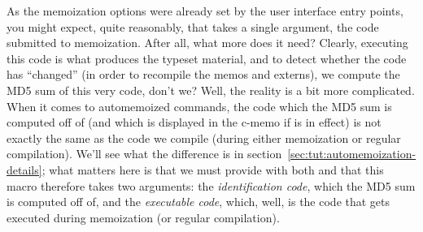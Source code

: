 \documentclass[a4paper,11pt]{article}
\begin{document}
\begin{center}
\end{center}

As the memoization options were already set by the user interface entry points,
you might expect, quite reasonably, that  takes a single
argument, the code submitted to memoization.  After all, what more does it
need?  Clearly, executing this code is what produces the typeset material, and
to detect whether the code has ``changed'' (in order to recompile the memos and
externs), we compute the MD5 sum of this very code, don't we?  Well, the
reality is a bit more complicated.  When it comes to automemoized commands, the
code which the MD5 sum is computed off of (and which is displayed in the c-memo
if  is in effect) is not exactly the same as
the code we compile (during either memoization or regular compilation).  We'll
see what the difference is in section~\ref{sec:tut:automemoization-details};
what matters here is that we must provide  with both and that
this macro therefore takes two arguments: the \emph{identification code}, which
the MD5 sum is computed off of, and the \emph{executable code}, which, well, is
the code that gets executed during memoization (or regular compilation).
\end{document}
